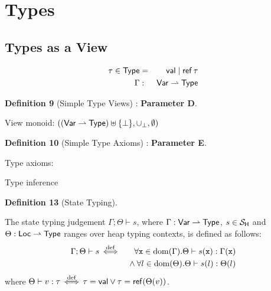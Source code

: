 \section{Types}

\subsection{Types as a View}

\begin{eqnarray*}
  \tau \in \mathsf{Type} &=& \mathsf{val} \mid \mathop{\mathsf{ref}} \tau
\\ \Gamma &:& \mathsf{Var} \rightharpoonup \mathsf{Type}
\end{eqnarray*}

\textbf{Definition 9} (Simple Type Views) : \textbf{Parameter D}.

View monoid: $((\mathsf{Var} \rightharpoonup \mathsf{Type})\uplus\{\bot\},\cup_\bot,\emptyset)$

\textbf{Definition 10} (Simple Type Axioms) : \textbf{Parameter E}.

Type axioms:

\def\op{\mathbin{\mathsf{op}}}
Type inference

\textbf{Definition 13} (State Typing).

The state typing judgement $\Gamma;\Theta \vdash s$,
where $\Gamma : \mathsf{Var} \rightharpoonup \mathsf{Type}$, $s \in \mathcal{S}_{\mathsf{H}}$
and $\Theta : \mathsf{Loc} \rightharpoonup \mathsf{Type}$ ranges
over heap typing contexts, is defined as follows:
\begin{eqnarray*}
   \Gamma;\Theta \vdash s
   &\mathrel{\stackrel{\mathrm{def}}{\,\Leftarrow\!\Rightarrow\,}}&
   \forall \mathtt{x} \in \mathrm{dom}(\Gamma) . \Theta \vdash s(\mathtt{x}) : \Gamma(\mathtt{x})
\\ && {} \land \forall l \in \mathrm{dom}(\Theta) . \Theta \vdash s(l) : \Theta(l)
\end{eqnarray*}
where $\Theta \vdash v : \tau \mathrel{\stackrel{\mathrm{def}}{\,\Leftarrow\!\Rightarrow\,}} \tau=\mathsf{val} \lor \tau=\mathop{\mathsf{ref}} (\Theta(v))$.



